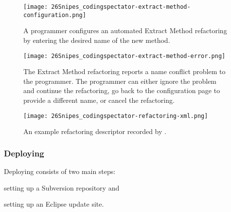\begin{figure}
%
\centering
%
\texttt{[image: 26Snipes\_codingspectator-extract-method-configuration.png]}
%
\caption{\label{FigCodingSpectatorExtractMethodConfigurationExample}A programmer
configures an automated Extract Method refactoring by entering the desired name
of the new method.}
%
\end{figure}

\begin{figure}
%
\centering
%
\texttt{[image: 26Snipes\_codingspectator-extract-method-error.png]}
%
\caption{\label{FigCodingSpectatorExtractMethodErrorExample}The Extract Method
refactoring reports a name conflict problem to the programmer. The programmer
can either ignore the problem and continue the refactoring, go back to the
configuration page to provide a different name, or cancel the refactoring.}
%
\end{figure}

\begin{figure}
%
\centering
%
\texttt{[image: 26Snipes\_codingspectator-refactoring-xml.png]}
%
\caption{\label{FigCodingSpectatorDescriptorExample}An example refactoring
descriptor recorded by \CodingSpectator.}
%
\end{figure}

\subsubsection{Deploying \CodingSpectator}

Deploying \CodingSpectator{} consists of two main steps:
%
\begin{inparaenum}[(1)]
%
\item setting up a Subversion repository and
%
\item setting up an Eclipse update site.
%
\end{inparaenum}

